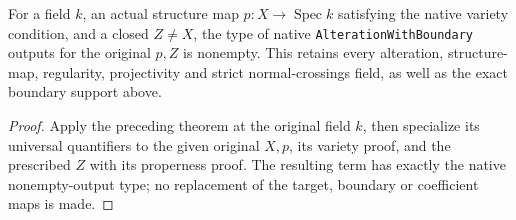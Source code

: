 \begin{corollary}
\label{cor:hironaka-dejong-prescribed-boundary}
\leanok
For a field $k$, an actual structure map
$p:X\to\operatorname{Spec}k$ satisfying the native variety condition,
and a closed $Z\ne X$, the type of native
\texttt{AlterationWithBoundary} outputs for the original $p,Z$ is
nonempty. This retains every alteration, structure-map, regularity,
projectivity and strict normal-crossings field, as well as the exact
boundary support above.
\end{corollary}
\begin{proof}
Apply the preceding theorem at the original field $k$, then specialize
its universal quantifiers to the given original $X,p$, its variety proof,
and the prescribed $Z$ with its properness proof. The resulting term has
exactly the native nonempty-output type; no replacement of the target,
boundary or coefficient maps is made.
\end{proof}
